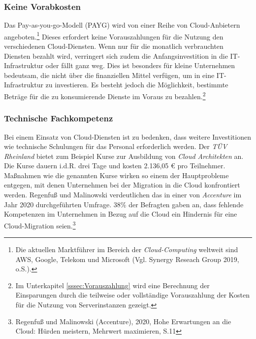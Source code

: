 \subsubsection{Keine Vorabkosten}
Das Pay-as-you-go-Modell (PAYG) wird von einer Reihe von Cloud-Anbietern angeboten.\footnote{Die aktuellen Marktführer im Bereich der \textit{Cloud-Computing} weltweit sind AWS, Google, Telekom und Microsoft (Vgl. Synergy Reseach Group 2019, o.S.\cite{STA6}).} Dieses erfordert keine Vorauszahlungen für die Nutzung den verschiedenen Cloud-Diensten. Wenn nur für die monatlich verbrauchten Diensten bezahlt wird, verringert sich zudem die Anfangsinvestition in die IT-Infrastruktur oder fällt ganz weg. Dies ist besonders für kleine Unternehmen bedeutsam, die nicht über die finanziellen Mittel verfügen, um in eine IT-Infrastruktur zu investieren. Es besteht jedoch die Möglichkeit, bestimmte Beträge für die zu konsumierende Dienste im Voraus zu bezahlen.\footnote{Im Unterkapitel \ref{sssec:Vorauszahlung} wird eine Berechnung der Einsparungen durch die teilweise oder vollständige Vorauszahlung der Kosten für die Nutzung von Serverinstanzen gezeigt.}  

\subsubsection{Technische Fachkompetenz}
Bei einem Einsatz von Cloud-Diensten ist zu bedenken, dass weitere Investitionen wie technische Schulungen für das Personal erforderlich werden. Der \textit{TÜV Rheinland} bietet zum Beispiel Kurse zur Ausbildung von \textit{Cloud Architekten} an. Die Kurse dauern i.d.R. drei Tage und kosten 2.136,05 € pro Teilnehmer. Maßnahmen wie die genannten Kurse wirken so einem der Hauptprobleme entgegen, mit denen Unternehmen bei der Migration in die Cloud konfrontiert werden. Regenfuß und Malinowski verdeutlichen das in einer von \textit{Accenture} im Jahr 2020 durchgeführten Umfrage. 38\% der Befragten gaben an, dass fehlende Kompetenzen im Unternehmen in Bezug auf die Cloud ein Hindernis für eine Cloud-Migration seien.\footnote{Regenfuß und Malinowski (Accenture), 2020, Hohe Erwartungen an die Cloud: Hürden meistern, Mehrwert maximieren, S.11\cite{ACC1}}

